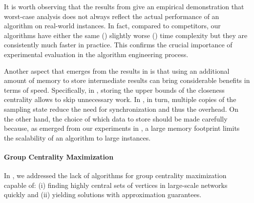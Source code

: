 It is worth observing that the results from
 give an empirical demonstration that
worst-case analysis does not always reflect the actual performance of an
algorithm on real-world instances. In fact, compared to competitors, our
algorithms have either the same ()  slightly worse
() time complexity but they are consistently much
faster in practice. This confirms the crucial importance of experimental
evaluation in the algorithm engineering process.

Another aspect that emerges from the results in
 is that using an additional amount
of memory to store intermediate results can bring considerable benefits in
terms of speed. Specifically, in , storing the upper bounds
of the closeness centrality allows to skip unnecessary work. In
, in turn, multiple copies of the sampling state
reduce the need for synchronization and thus the overhead.
On the other hand, the choice of which data to store should be made carefully
because, as emerged from our experiments in , a
large memory footprint limits the scalability of an algorithm to large instances.


\paragraph{Group Centrality Maximization}
%
In , we addressed the lack of algorithms for group
centrality maximization capable of: (i) finding highly central sets of vertices
in large-scale networks quickly and (ii) yielding solutions with approximation
guarantees.


